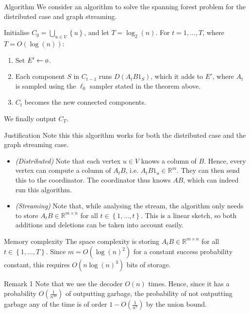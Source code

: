 \documentclass[a4paper]{article}
\begin{document}
\begin{parag}{Algorithm}
    We consider an algorithm to solve the spanning forest problem for the distributed case and graph streaming. 

    Initialise $C_0 = \bigcup_{u \in V} \left\{u\right\}$, and let $T = \log_{2}\left(n\right)$. For $t = 1, \ldots, T$, where $T = O\left(\log\left(n\right)\right)$:
    \begin{enumerate}
        \item Set $E' \leftarrow \o$.
        \item Each component $S$ in $C_{t-1}$ runs $D\left(A_t B 1_S\right)$, which it adds to $E'$, where $A_t$ is sampled using the $\ell_0$ sampler stated in the theorem above.
        \item $C_t$ becomes the new connected components.
    \end{enumerate}

    We finally output $C_T$.

    \begin{subparag}{Justification}
        Note this this algorithm works for both the distributed case and the graph streaming case.
        \begin{itemize}[left=0pt]
            \item \textit{(Distributed)} Note that each vertex $u \in V$ knows a column of $B$. Hence, every vertex can compute a column of $A_t B$, i.e. $A_t B 1_u \in \mathbb{R}^m$. They can then send this to the coordinator. The coordinator thus knows $AB$, which can indeed run this algorithm.
            \item \textit{(Streaming)} Note that, while analysing the stream, the algorithm only needs to store $A_t B \in \mathbb{R}^{m \times n}$ for all $t \in \left\{1, \ldots, t\right\}$. This is a linear sketch, so both additions and deletions can be taken into account easily.
        \end{itemize}
    \end{subparag}

    \begin{subparag}{Memory complexity}
        The space complexity is storing $A_tB \in \mathbb{R}^{m \times n}$ for all $t \in \left\{1, \ldots, T\right\}$. Since $m = O\left(\log\left(n\right)^2\right)$ for a constant success probability constant, this requires $O\left(n \log\left(n\right)^3\right)$ bits of storage.
    \end{subparag}

    \begin{subparag}{Remark 1}
        Note that we use the decoder $O\left(n\right)$ times. Hence, since it has a probability $O\left(\frac{1}{n^{10}}\right)$ of outputting garbage, the probability of not outputting garbage any of the time is of order $1 - O\left(\frac{1}{n^9}\right)$ by the union bound.


\end{subparag}
\end{parag}
\end{document}
